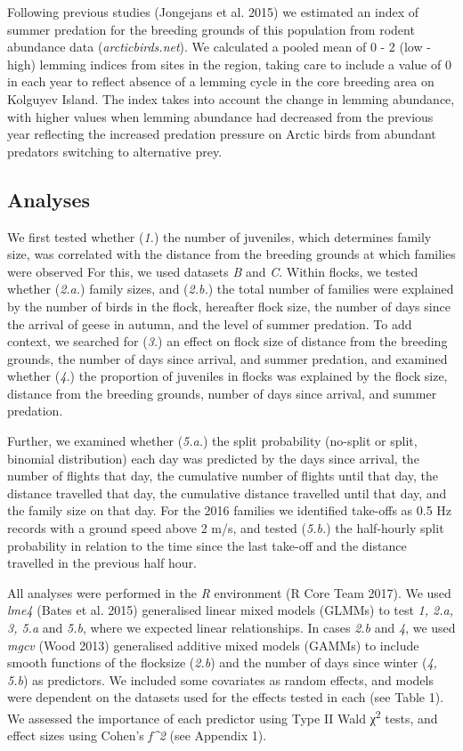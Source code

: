\documentclass[10pt,twocolumn]{paper}
\begin{document}
Following previous studies (Jongejans et al. 2015) we estimated an index
of summer predation for the breeding grounds of this population from
rodent abundance data (\emph{arcticbirds.net}). We calculated a pooled
mean of 0 - 2 (low - high) lemming indices from sites in the region,
taking care to include a value of 0 in each year to reflect absence of a
lemming cycle in the core breeding area on Kolguyev Island. The index
takes into account the change in lemming abundance, with higher values
when lemming abundance had decreased from the previous year reflecting
the increased predation pressure on Arctic birds from abundant predators
switching to alternative prey.

\subsection{Analyses}\label{analyses}

We first tested whether (\emph{1.}) the number of juveniles, which
determines family size, was correlated with the distance from the
breeding grounds at which families were observed For this, we used
datasets \emph{B} and \emph{C}. Within flocks, we tested whether
(\emph{2.a.}) family sizes, and (\emph{2.b.}) the total number of
families were explained by the number of birds in the flock, hereafter
flock size, the number of days since the arrival of geese in autumn, and
the level of summer predation. To add context, we searched for
(\emph{3.}) an effect on flock size of distance from the breeding
grounds, the number of days since arrival, and summer predation, and
examined whether (\emph{4.}) the proportion of juveniles in flocks was
explained by the flock size, distance from the breeding grounds, number
of days since arrival, and summer predation.

Further, we examined whether (\emph{5.a.}) the split probability
(no-split or split, binomial distribution) each day was predicted by the
days since arrival, the number of flights that day, the cumulative
number of flights until that day, the distance travelled that day, the
cumulative distance travelled until that day, and the family size on
that day. For the 2016 families we identified take-offs as 0.5 Hz
records with a ground speed above 2 m/s, and tested (\emph{5.b.}) the
half-hourly split probability in relation to the time since the last
take-off and the distance travelled in the previous half hour.

All analyses were performed in the \emph{R} environment (R Core Team
2017). We used \emph{lme4} (Bates et al. 2015) generalised linear mixed
models (GLMMs) to test \emph{1, 2.a, 3, 5.a} and \emph{5.b}, where we
expected linear relationships. In cases \emph{2.b} and \emph{4}, we used
\emph{mgcv} (Wood 2013) generalised additive mixed models (GAMMs) to
include smooth functions of the flocksize (\emph{2.b}) and the number of
days since winter (\emph{4, 5.b}) as predictors. We included some
covariates as random effects, and models were dependent on the datasets
used for the effects tested in each (see Table 1). We assessed the
importance of each predictor using Type II Wald χ\textsuperscript{2}
tests, and effect sizes using Cohen's \emph{f\^{}2} (see Appendix 1).
\end{document}
